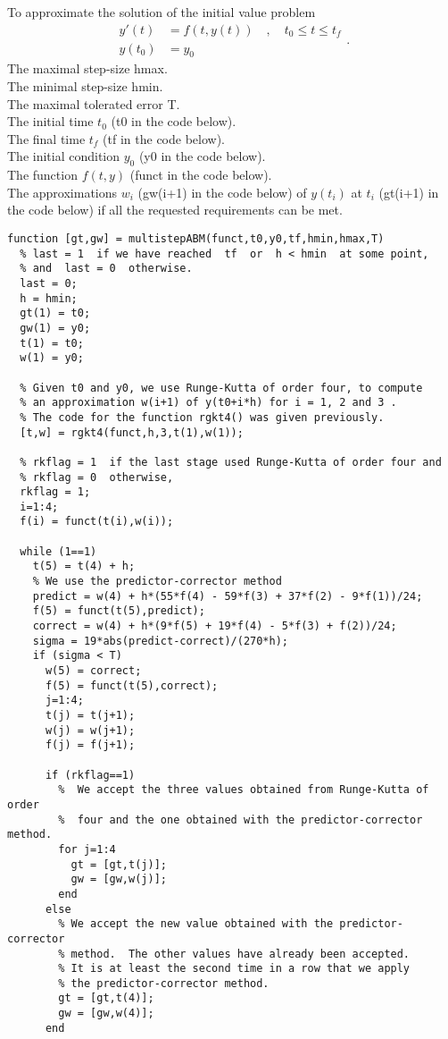 \begin{code}
To approximate the solution of the initial value problem
\[
\begin{split}
y'(t) &= f(t,y(t)) \quad, \quad t_0 \leq t \leq t_f \\
y(t_0) &= y_0
\end{split} .
\]
 The maximal step-size  hmax.\\
The minimal step-size  hmin.\\
The maximal tolerated error  T.\\
The initial time $t_0$ (t0 in the code below).\\
The final time $t_f$ (tf in the code below).\\
The initial condition $y_0$ (y0 in the code below).\\
The function $f(t,y)$ (funct in the code below).\\
 The approximations $w_i$ (gw(i+1) in the code below)
of $y(t_i)$ at $t_i$ (gt(i+1) in the code below) if all the requested
requirements can be met.
\small
\begin{verbatim}
function [gt,gw] = multistepABM(funct,t0,y0,tf,hmin,hmax,T)
  % last = 1  if we have reached  tf  or  h < hmin  at some point,
  % and  last = 0  otherwise.
  last = 0;
  h = hmin;
  gt(1) = t0;
  gw(1) = y0;
  t(1) = t0;
  w(1) = y0;

  % Given t0 and y0, we use Runge-Kutta of order four, to compute
  % an approximation w(i+1) of y(t0+i*h) for i = 1, 2 and 3 .
  % The code for the function rgkt4() was given previously.
  [t,w] = rgkt4(funct,h,3,t(1),w(1));

  % rkflag = 1  if the last stage used Runge-Kutta of order four and
  % rkflag = 0  otherwise,
  rkflag = 1;
  i=1:4;
  f(i) = funct(t(i),w(i));
  
  while (1==1)
    t(5) = t(4) + h;
    % We use the predictor-corrector method
    predict = w(4) + h*(55*f(4) - 59*f(3) + 37*f(2) - 9*f(1))/24;
    f(5) = funct(t(5),predict);
    correct = w(4) + h*(9*f(5) + 19*f(4) - 5*f(3) + f(2))/24;
    sigma = 19*abs(predict-correct)/(270*h);
    if (sigma < T)
      w(5) = correct;
      f(5) = funct(t(5),correct);
      j=1:4;
      t(j) = t(j+1);
      w(j) = w(j+1);
      f(j) = f(j+1);

      if (rkflag==1)
        %  We accept the three values obtained from Runge-Kutta of order
        %  four and the one obtained with the predictor-corrector method.
        for j=1:4
          gt = [gt,t(j)];
          gw = [gw,w(j)];
        end
      else
        % We accept the new value obtained with the predictor-corrector
        % method.  The other values have already been accepted.
        % It is at least the second time in a row that we apply
        % the predictor-corrector method.
        gt = [gt,t(4)];
        gw = [gw,w(4)];
      end


\end{verbatim}
\end{code}
